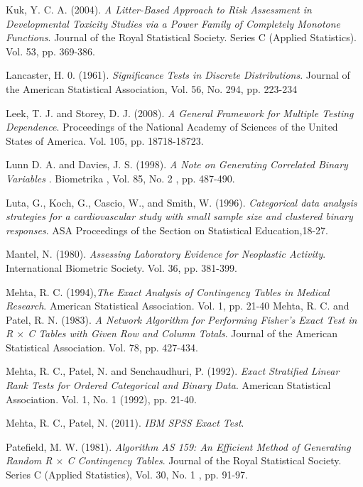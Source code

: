\documentclass[12pt,oneside]{report}
\theoremstyle{definition}
\theoremstyle{mystyle}
\begin{document}
\begin{thebibliography}{99}
Kuk, Y. C. A. (2004). \emph{A Litter-Based Approach to Risk Assessment in Developmental Toxicity Studies via a Power Family of Completely Monotone Functions}. Journal of the Royal Statistical Society. Series C (Applied Statistics). Vol. 53, pp. 369-386.


Lancaster, H. 0. (1961).  \emph{Significance Tests in Discrete Distributions}.  Journal of the American Statistical Association, Vol. 56, No. 294, pp. 223-234


Leek, T. J. and  Storey, D. J. (2008).  \emph{A General Framework for Multiple Testing Dependence}. Proceedings of the National Academy of Sciences of the United States of America. Vol. 105, pp. 18718-18723.

Lunn D. A. and  Davies, J. S. (1998).  \emph{A Note on Generating Correlated Binary Variables }. Biometrika , Vol. 85, No. 2 , pp. 487-490.


Luta, G., Koch, G., Cascio, W., and Smith, W. (1996). \emph{Categorical
	data analysis strategies for a cardiovascular study
	with small sample size and clustered binary responses}.  ASA Proceedings of the Section on Statistical Education,18-27.


Mantel, N. (1980). \emph{Assessing Laboratory Evidence for Neoplastic Activity}. International Biometric Society. Vol. 36, pp. 381-399.






Mehta, R. C. (1994),\emph{The Exact Analysis of Contingency Tables in Medical Research}. American Statistical Association. Vol. 1, pp. 21-40
Mehta, R. C. and  Patel, R. N. (1983). \emph{A Network Algorithm for Performing Fisher's Exact Test in R $\times$ C Tables with Given Row
	and Column Totals}. Journal of the American Statistical Association. Vol. 78, pp. 427-434.

Mehta, R. C., Patel, N. and  Senchaudhuri, P. (1992). \emph{Exact Stratified Linear Rank Tests for Ordered Categorical and Binary Data}. American Statistical Association. Vol. 1, No. 1 (1992), pp. 21-40.

Mehta, R. C., Patel, N. (2011). \emph{IBM SPSS Exact Test}.

Patefield, M. W. (1981). \emph{Algorithm AS 159: An Efficient Method of Generating Random R $\times$ C Contingency Tables}. Journal of the Royal Statistical Society. Series C (Applied Statistics), Vol. 30, No. 1 , pp. 91-97.



\end{thebibliography}
\end{document}
